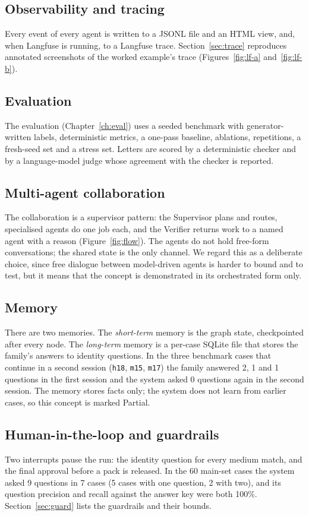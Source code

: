 \documentclass[12pt,a4paper,oneside]{report}
\begin{document}
\subsection{Observability and tracing}
Every event of every agent is written to a JSONL file and an HTML view, and, when Langfuse is running, to a Langfuse trace. Section~\ref{sec:trace} reproduces annotated screenshots of the worked example's trace (Figures~\ref{fig:lf-a} and~\ref{fig:lf-b}).

\subsection{Evaluation}
The evaluation (Chapter~\ref{ch:eval}) uses a seeded benchmark with generator-written labels, deterministic metrics, a one-pass baseline, ablations, repetitions, a fresh-seed set and a stress set. Letters are scored by a deterministic checker and by a language-model judge whose agreement with the checker is reported.

\subsection{Multi-agent collaboration}
The collaboration is a supervisor pattern: the Supervisor plans and routes, specialised agents do one job each, and the Verifier returns work to a named agent with a reason (Figure~\ref{fig:flow}). The agents do not hold free-form conversations; the shared state is the only channel. We regard this as a deliberate choice, since free dialogue between model-driven agents is harder to bound and to test, but it means that the concept is demonstrated in its orchestrated form only.

\subsection{Memory}\label{sec:memory}
There are two memories. The \emph{short-term} memory is the graph state, checkpointed after every node. The \emph{long-term} memory is a per-case SQLite file that stores the family's answers to identity questions. In the three benchmark cases that continue in a second session (\texttt{h18}, \texttt{m15}, \texttt{m17}) the family answered 2, 1 and 1 questions in the first session and the system asked 0 questions again in the second session. The memory stores facts only; the system does not learn from earlier cases, so this concept is marked Partial.

\subsection{Human-in-the-loop and guardrails}\label{sec:hitl}
Two interrupts pause the run: the identity question for every medium match, and the final approval before a pack is released. In the 60 main-set cases the system asked 9 questions in 7 cases (5 cases with one question, 2 with two), and its question precision and recall against the answer key were both 100\%. Section~\ref{sec:guard} lists the guardrails and their bounds.
\end{document}

